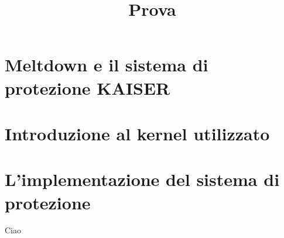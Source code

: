 \documentclass[a4paper,12pt]{report}
\title{Prova}
\begin{document}
\maketitle

\begin{abstract}

\end{abstract}

\chapter{Meltdown e il sistema di protezione KAISER}

\chapter{Introduzione al kernel utilizzato}

\chapter{L'implementazione del sistema di protezione}
Ciao \cite{Lipp:meltdown}\cite{Gruss:kaslr}

\printbibliography[heading=bibintoc]
\end{document}
